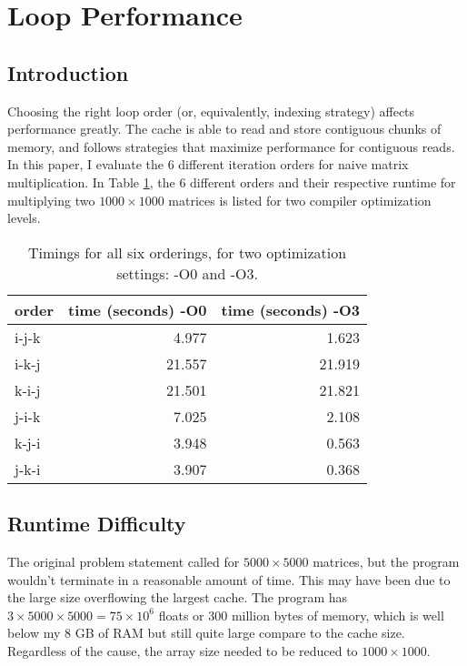 \documentclass[12pt,letterpaper]{article}
\begin{document}
\section*{Loop Performance}

\subsection*{Introduction}

Choosing the right loop order (or, equivalently, indexing strategy) affects performance greatly. The
cache is able to read and store contiguous chunks of memory, and follows strategies that maximize
performance for contiguous reads. In this paper, I evaluate the 6 different iteration orders for
naive matrix multiplication. In Table \ref{table:perf}, the 6 different orders and their respective
runtime for multiplying two $1000\times 1000$ matrices is listed for two compiler optimization
levels.

\begin{table}[h!]
    \centering
    \begin{tabular}{l| r|r}
        order & time (seconds) -O0 & time (seconds) -O3\\
        \hline
        i-j-k & 4.977  & 1.623\\
        i-k-j & 21.557 & 21.919\\
        k-i-j & 21.501 & 21.821\\
        j-i-k & 7.025  & 2.108\\
        k-j-i & 3.948  & 0.563\\
        j-k-i & 3.907  & 0.368
    \end{tabular}
    \caption{Timings for all six orderings, for two optimization settings: -O0 and -O3.}
    \label{table:perf}
\end{table}

\subsection*{Runtime Difficulty}

The original problem statement called for $5000\times 5000$ matrices, but the program wouldn't
terminate in a reasonable amount of time. This may have been due to the large size overflowing the
largest cache. The program has $3\times 5000 \times 5000 = 75\times 10^6$ floats or 300 million
bytes of memory, which is well below my 8 GB of RAM but still quite large compare to the cache size.
Regardless of the cause, the array size needed to be reduced to $1000 \times 1000$.
\end{document}
